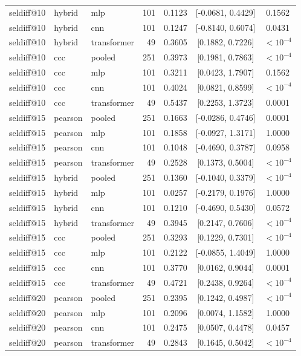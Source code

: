 \begin{longtable}{lllrrcc}
seldiff@10 & hybrid & mlp & 101 & 0.1123 & [-0.0681, 0.4429] & 0.1562 \\
seldiff@10 & hybrid & cnn & 101 & 0.1247 & [-0.8140, 0.6074] & 0.0431 \\
seldiff@10 & hybrid & transformer & 49 & 0.3605 & [0.1882, 0.7226] & $<10^{-4}$ \\
seldiff@10 & ccc & pooled & 251 & 0.3973 & [0.1981, 0.7863] & $<10^{-4}$ \\
seldiff@10 & ccc & mlp & 101 & 0.3211 & [0.0423, 1.7907] & 0.1562 \\
seldiff@10 & ccc & cnn & 101 & 0.4024 & [0.0821, 0.8599] & $<10^{-4}$ \\
seldiff@10 & ccc & transformer & 49 & 0.5437 & [0.2253, 1.3723] & 0.0001 \\
seldiff@15 & pearson & pooled & 251 & 0.1663 & [-0.0286, 0.4746] & 0.0001 \\
seldiff@15 & pearson & mlp & 101 & 0.1858 & [-0.0927, 1.3171] & 1.0000 \\
seldiff@15 & pearson & cnn & 101 & 0.1048 & [-0.4690, 0.3787] & 0.0958 \\
seldiff@15 & pearson & transformer & 49 & 0.2528 & [0.1373, 0.5004] & $<10^{-4}$ \\
seldiff@15 & hybrid & pooled & 251 & 0.1360 & [-0.1040, 0.3379] & $<10^{-4}$ \\
seldiff@15 & hybrid & mlp & 101 & 0.0257 & [-0.2179, 0.1976] & 1.0000 \\
seldiff@15 & hybrid & cnn & 101 & 0.1210 & [-0.4690, 0.5430] & 0.0572 \\
seldiff@15 & hybrid & transformer & 49 & 0.3945 & [0.2147, 0.7606] & $<10^{-4}$ \\
seldiff@15 & ccc & pooled & 251 & 0.3293 & [0.1229, 0.7301] & $<10^{-4}$ \\
seldiff@15 & ccc & mlp & 101 & 0.2122 & [-0.0855, 1.4049] & 1.0000 \\
seldiff@15 & ccc & cnn & 101 & 0.3770 & [0.0162, 0.9044] & 0.0001 \\
seldiff@15 & ccc & transformer & 49 & 0.4721 & [0.2438, 0.9264] & $<10^{-4}$ \\
seldiff@20 & pearson & pooled & 251 & 0.2395 & [0.1242, 0.4987] & $<10^{-4}$ \\
seldiff@20 & pearson & mlp & 101 & 0.2096 & [0.0074, 1.1582] & 1.0000 \\
seldiff@20 & pearson & cnn & 101 & 0.2475 & [0.0507, 0.4478] & 0.0457 \\
seldiff@20 & pearson & transformer & 49 & 0.2843 & [0.1645, 0.5042] & $<10^{-4}$ \\

\end{longtable}
